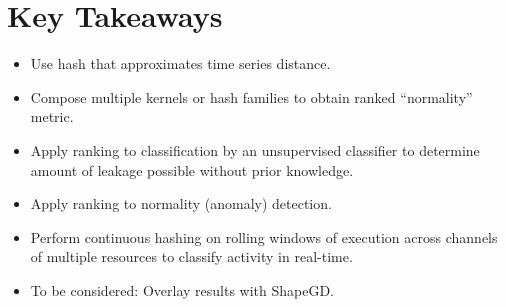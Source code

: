 \documentclass[a4paper]{article}
\begin{document}
\section{Key Takeaways}

\begin{itemize}
    \item Use hash that approximates time series distance.
    \item Compose multiple kernels or hash families to obtain ranked ``normality'' metric.
    \item Apply ranking to classification by an unsupervised classifier to determine amount of leakage possible without prior knowledge.
    \item Apply ranking to normality (anomaly) detection.
    \item Perform continuous hashing on rolling windows of execution across channels of multiple resources to classify activity in real-time.
    \item To be considered: Overlay results with ShapeGD\@.
\end{itemize}



\end{document}
